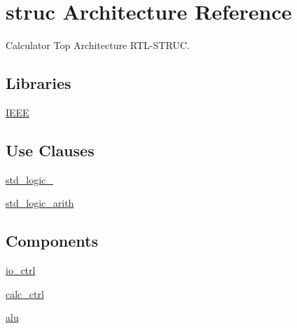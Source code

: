 \hypertarget{classcalc__top_1_1struc}{}\section{struc Architecture Reference}
\label{classcalc__top_1_1struc}


Calculator Top Architecture R\+T\+L-\/\+S\+T\+R\+UC.  


\subsection*{Libraries}
 \begin{DoxyCompactItemize}
\item 
\hyperlink{classcalc__top_1_1struc_ae4f03c286607f3181e16b9aa12d0c6d4}{I\+E\+EE} 
\end{DoxyCompactItemize}
\subsection*{Use Clauses}
 \begin{DoxyCompactItemize}
\item 
\hyperlink{classcalc__top_1_1struc_acd03516902501cd1c7296a98e22c6fcb}{std\+\_\+logic\+\_}   
\item 
\hyperlink{classcalc__top_1_1struc_a0f5ecc6613f63d07f7963a97b1b26095}{std\+\_\+logic\+\_\+arith}   
\end{DoxyCompactItemize}
\subsection*{Components}
 \begin{DoxyCompactItemize}
\item 
\hyperlink{classcalc__top_1_1struc_a97c813578819a319bf5e8c6d53894fea}{io\+\_\+ctrl}  {\bfseries }  
\item 
\hyperlink{classcalc__top_1_1struc_a107e48c926f0bc80ef4d44886a9244be}{calc\+\_\+ctrl}  {\bfseries }  
\item 
\hyperlink{classcalc__top_1_1struc_a205ce47b385f0dede25ae06417988605}{alu}  {\bfseries }  
\end{DoxyCompactItemize}
